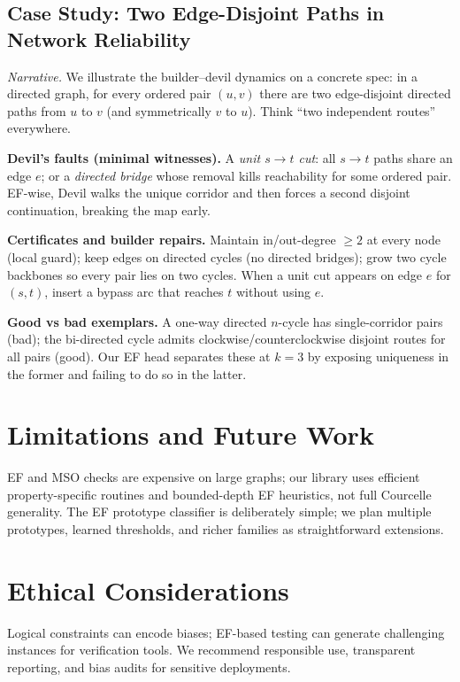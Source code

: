 \documentclass{article}
\begin{document}
\subsection{Case Study: Two Edge-Disjoint Paths in Network Reliability}
\label{sec:digraph-case}

\textit{Narrative.}
We illustrate the builder--devil dynamics on a concrete spec: in a directed graph, for every ordered pair $(u,v)$ there are two edge-disjoint directed paths from $u$ to $v$ (and symmetrically $v$ to $u$). Think ``two independent routes'' everywhere.

\textbf{Devil's faults (minimal witnesses).}
A \emph{unit $s\!\to\!t$ cut}: all $s\!\to\!t$ paths share an edge $e$; or a \emph{directed bridge} whose removal kills reachability for some ordered pair. EF-wise, Devil walks the unique corridor and then forces a second disjoint continuation, breaking the map early.

\textbf{Certificates and builder repairs.}
Maintain in/out-degree $\ge 2$ at every node (local guard); keep edges on directed cycles (no directed bridges); grow two cycle backbones so every pair lies on two cycles. When a unit cut appears on edge $e$ for $(s,t)$, insert a bypass arc that reaches $t$ without using $e$.

\textbf{Good vs bad exemplars.}
A one-way directed $n$-cycle has single-corridor pairs (bad); the bi-directed cycle admits clockwise/counterclockwise disjoint routes for all pairs (good). Our EF head separates these at $k\!=\!3$ by exposing uniqueness in the former and failing to do so in the latter.

\section{Limitations and Future Work}
EF and MSO checks are expensive on large graphs; our library uses efficient property-specific routines and bounded-depth EF heuristics, not full Courcelle generality. The EF prototype classifier is deliberately simple; we plan multiple prototypes, learned thresholds, and richer families as straightforward extensions.

\section{Ethical Considerations}
Logical constraints can encode biases; EF-based testing can generate challenging instances for verification tools. We recommend responsible use, transparent reporting, and bias audits for sensitive deployments.
\end{document}
